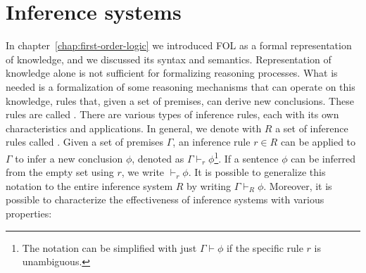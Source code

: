 \chapter{Inference systems}\label{chap:inference-systems}

In chapter~\ref{chap:first-order-logic} we introduced FOL as a formal representation of knowledge, and we discussed its syntax and semantics.
Representation of knowledge alone is not sufficient for formalizing reasoning processes.
What is needed is a formalization of some reasoning mechanisms that can operate on this knowledge, rules that, given a set of premises, can derive new conclusions.
These rules are called .
There are various types of inference rules, each with its own characteristics and applications.
In general, we denote with \(R\) a set of inference rules called . Given a set of premises \(\Gamma\), an inference rule \(r \in R\) can be applied to \(\Gamma\) to infer a new conclusion \(\phi\), denoted as \(\Gamma \vdash_r \phi\)\footnote{
  The notation can be simplified with just \(\Gamma \vdash \phi\) if the specific rule \(r\) is unambiguous.}.
If a sentence \(\phi\) can be inferred from the empty set using \(r\), we write \(\vdash_r \phi\).
It is possible to generalize this notation to the entire inference system \(R\) by writing \(\Gamma \vdash_{R} \phi\).
Moreover, it is possible to characterize the effectiveness of inference systems with various properties:

